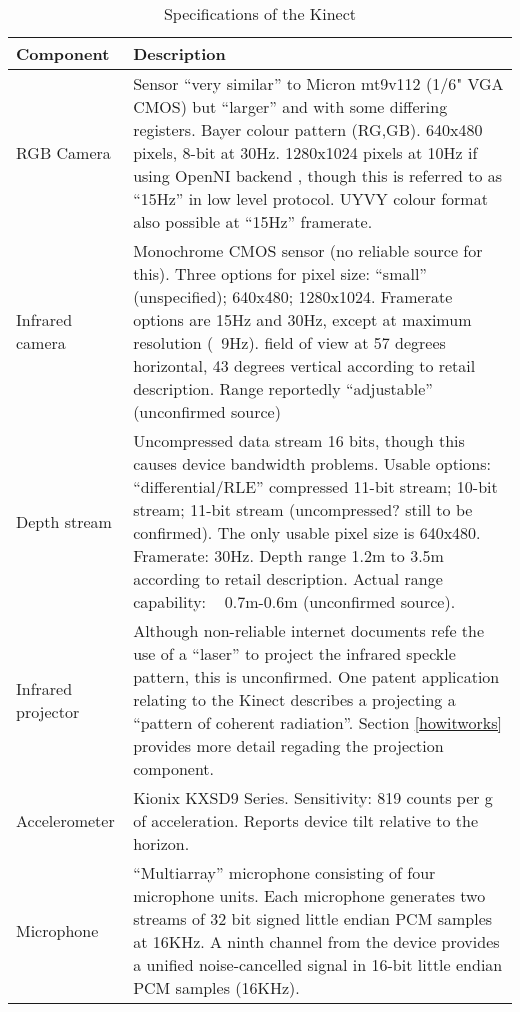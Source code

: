 %
\begin{table}[h]
\centering
\begin{tabular}{l p{10cm}}
\toprule
Component & Description \\
\midrule

RGB Camera & Sensor ``very similar'' to Micron mt9v112 (1/6" VGA CMOS) but
``larger'' and with some differing registers. Bayer colour pattern (RG,GB).
640x480 pixels, 8-bit at 30Hz.  1280x1024 pixels at 10Hz if using OpenNI backend
, though this is referred to as ``15Hz'' in low level protocol. UYVY colour
format also possible at ``15Hz'' framerate.\cite{FREENECT}\cite{RGBDEMO} \\

Infrared camera & Monochrome CMOS sensor (no reliable source for this). Three
options for pixel size: ``small'' (unspecified); 640x480; 1280x1024. Framerate
options are 15Hz and 30Hz, except at maximum resolution (~9Hz).\cite{FREENECT}
field of view at 57 degrees horizontal, 43 degrees vertical according to retail
description.\cite{PLAY} Range reportedly ``adjustable'' (unconfirmed source) \\ 

Depth stream & Uncompressed data stream 16 bits, though this causes device
bandwidth problems. Usable options: ``differential/RLE'' compressed 11-bit
stream; 10-bit stream; 11-bit stream (uncompressed? still to be confirmed). The
only usable pixel size is 640x480. Framerate: 30Hz. \cite{FREENECT} Depth range
1.2m to 3.5m according to retail description.\cite{PLAY} Actual range
capability: ~ 0.7m-0.6m (unconfirmed source).\\

Infrared projector & Although non-reliable internet documents refe the use of a
``laser'' to project the infrared speckle pattern, this is unconfirmed. One
patent application relating to the Kinect describes a projecting a ``pattern of
coherent radiation''.\cite{SHPUNT:2010-1} Section \ref{howitworks} provides more
detail regading the projection component. \\

Accelerometer & Kionix KXSD9 Series. Sensitivity: 819 counts per g of
acceleration. Reports device tilt relative to the
horizon.\cite{FREENECT}\cite{KIONIX}\\

Microphone & ``Multiarray'' microphone consisting of four microphone units. Each
microphone generates two streams of 32 bit signed little endian PCM samples at
16KHz. A ninth channel from the device provides a unified noise-cancelled signal
in 16-bit little endian PCM samples (16KHz).\cite{FREENECT}\\

\bottomrule
\end{tabular}
\caption{Specifications of the Kinect}
\label{tab:specs}
\end{table}

